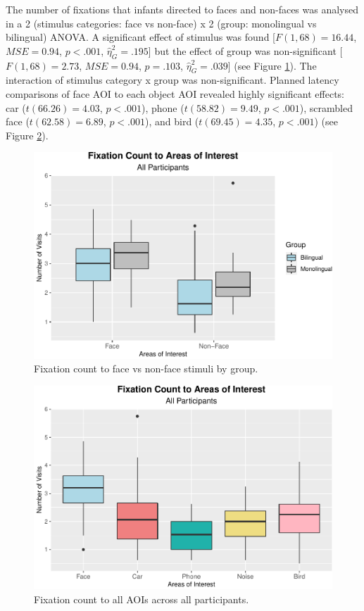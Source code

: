 \documentclass[english,man,floatsintext]{apa6}
\begin{document}
The number of fixations that infants directed to faces and non-faces was analysed in a 2 (stimulus categories: face vs non-face) x 2 (group: monolingual vs bilingual) ANOVA. A significant effect of stimulus was found {[}\(F(1, 68) = 16.44\), \(\mathit{MSE} = 0.94\), \(p < .001\), \(\hat{\eta}^2_G = .195\){]} but the effect of group was non-significant {[}\(F(1, 68) = 2.73\), \(\mathit{MSE} = 0.94\), \(p = .103\), \(\hat{\eta}^2_G = .039\){]} (see Figure \ref{fig:count2plot}). The interaction of stimulus category x group was non-significant. Planned latency comparisons of face AOI to each object AOI revealed highly significant effects: car (\(t(66.26) = 4.03\), \(p < .001\)), phone (\(t(58.82) = 9.49\), \(p < .001\)), scrambled face (\(t(62.58) = 6.89\), \(p < .001\)), and bird (\(t(69.45) = 4.35\), \(p < .001\)) (see Figure \ref{fig:allcountplot}).

\begin{figure}
\includegraphics{Effects_of_early_language_experience_on_infants_files/figure-latex/count2plot-1} \caption{Fixation count to face vs non-face stimuli by group.}\label{fig:count2plot}
\end{figure}

\begin{figure}
\includegraphics{Effects_of_early_language_experience_on_infants_files/figure-latex/allcountplot-1} \caption{Fixation count to all AOIs across all participants.}\label{fig:allcountplot}
\end{figure}
\end{document}

